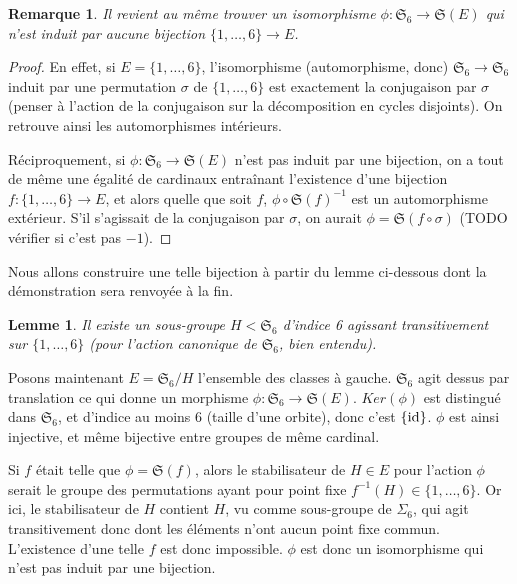 \documentclass[a4paper, 11pt]{article}
\def\Sigmap{\mathfrak{S}}
\newtheorem*{lemma}{Lemme}
\newtheorem*{remark}{Remarque}
\begin{document}
\begin{remark}
  Il revient au même trouver un isomorphisme $\phi : \Sigmap_6 \to \Sigmap(E)$
  qui n'est induit par aucune bijection $\{1,\ldots,6\} \to E$.
\end{remark}
\begin{proof}
  En effet, si $E = \{1,\ldots,6\}$, l'isomorphisme (automorphisme, donc)
  $\Sigmap_6 \to \Sigmap_6$ induit par une permutation $\sigma$ de
  $\{1,\ldots,6\}$ est exactement la conjugaison par $\sigma$ (penser à l'action
  de la conjugaison sur la décomposition en cycles disjoints). On retrouve ainsi
  les automorphismes intérieurs.

  Réciproquement, si $\phi : \Sigmap_6 \to \Sigmap(E)$ n'est pas induit par une
  bijection, on a tout de même une égalité de cardinaux entraînant l'existence
  d'une bijection $f : \{1,\ldots,6\} \to E$, et alors quelle que soit $f$,
  $\phi \circ \Sigmap(f)^{-1}$ est un automorphisme extérieur. S'il s'agissait
  de la conjugaison par $\sigma$, on aurait $\phi = \Sigmap(f \circ \sigma)$
  (TODO vérifier si c'est pas $-1$).
\end{proof}

Nous allons construire une telle bijection à partir du lemme ci-dessous dont la
démonstration sera renvoyée à la fin.

\begin{lemma}
  Il existe un sous-groupe $H < \Sigmap_6$ d'indice 6 agissant transitivement
  sur $\{1,\ldots,6\}$ (pour l'action canonique de $\Sigmap_6$, bien entendu).
\end{lemma}

Posons maintenant $E = \Sigmap_6/H$ l'ensemble des classes à gauche. $\Sigmap_6$
agit dessus par translation ce qui donne un morphisme $\phi : \Sigmap_6 \to
\Sigmap(E)$. $Ker(\phi)$ est distingué dans $\Sigmap_6$, et d'indice au moins 6
(taille d'une orbite), donc c'est $\{\textnormal{id}\}$. $\phi$ est ainsi
injective, et même bijective entre groupes de même cardinal.

Si $f$ était telle que $\phi = \Sigmap(f)$, alors le stabilisateur de $H \in E$
pour l'action $\phi$ serait le groupe des permutations ayant pour point fixe
$f^{-1}(H) \in \{1,\ldots,6\}$. Or ici, le stabilisateur de $H$ contient $H$, vu
comme sous-groupe de $\Sigma_6$, qui agit transitivement donc dont les éléments
n'ont aucun point fixe commun. L'existence d'une telle $f$ est donc impossible.
$\phi$ est donc un isomorphisme qui n'est pas induit par une bijection.
\end{document}
